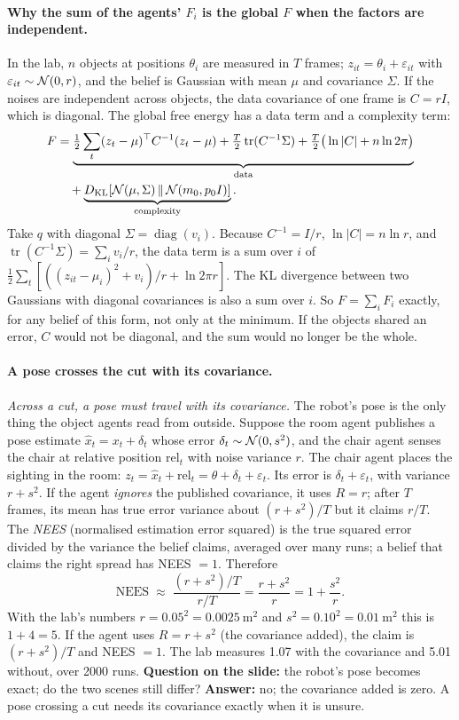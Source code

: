 \documentclass[11pt]{article}
\newcommand{\slt}[1]{\emph{#1}}   %
\begin{document}
\paragraph{Why the sum of the agents' $F_i$ is the global $F$ when the factors are independent.} In the lab, $n$ objects at positions $\theta_i$ are measured in $T$ frames; $z_{it}=\theta_i+\varepsilon_{it}$ with $\varepsilon_{it}\sim\mathcal{N}(0,r)$, and the belief is Gaussian with mean $\mu$ and covariance $\Sigma$. If the noises are independent across objects, the data covariance of one frame is $C=rI$, which is diagonal. The global free energy has a data term and a complexity term:
\begin{align*}
F&=\underbrace{\tfrac12\sum_{t}(z_t-\mu)^{\top}C^{-1}(z_t-\mu)+\tfrac T2\operatorname{tr}(C^{-1}\Sigma)+\tfrac T2\big(\ln|C|+n\ln 2\pi\big)}_{\text{data}}\\
&\quad+\underbrace{D_{\mathrm{KL}}\!\left[\mathcal{N}(\mu,\Sigma)\,\middle\|\,\mathcal{N}(m_0,p_0 I)\right]}_{\text{complexity}} .
\end{align*}
Take $q$ with diagonal $\Sigma=\operatorname{diag}(v_i)$. Because $C^{-1}=I/r$, $\ln|C|=n\ln r$, and $\operatorname{tr}(C^{-1}\Sigma)=\sum_i v_i/r$, the data term is a sum over $i$ of $\tfrac12\sum_t[((z_{it}-\mu_i)^2+v_i)/r+\ln 2\pi r]$. The KL divergence between two Gaussians with diagonal covariances is also a sum over $i$. So $F=\sum_i F_i$ exactly, for any belief of this form, not only at the minimum. If the objects shared an error, $C$ would not be diagonal, and the sum would no longer be the whole.

\paragraph{A pose crosses the cut with its covariance.} \slt{Across a cut, a pose must travel with its covariance.} The robot's pose is the only thing the object agents read from outside. Suppose the room agent publishes a pose estimate $\hat x_t = x_t + \delta_t$ whose error $\delta_t\sim\mathcal{N}(0,s^2)$, and the chair agent senses the chair at relative position $\mathrm{rel}_{t}$ with noise variance $r$. The chair agent places the sighting in the room: $z_t=\hat x_t+\mathrm{rel}_t=\theta+\delta_t+\varepsilon_t$. Its error is $\delta_t+\varepsilon_t$, with variance $r+s^2$. If the agent \emph{ignores} the published covariance, it uses $R=r$; after $T$ frames, its mean has true error variance about $(r+s^2)/T$ but it claims $r/T$. The \emph{NEES} (normalised estimation error squared) is the true squared error divided by the variance the belief claims, averaged over many runs; a belief that claims the right spread has NEES $=1$. Therefore
\[
\text{NEES}\;\approx\;\frac{(r+s^2)/T}{r/T}=\frac{r+s^2}{r}=1+\frac{s^2}{r}.
\]
With the lab's numbers $r=0.05^2=0.0025\ \text{m}^2$ and $s^2=0.10^2=0.01\ \text{m}^2$ this is $1+4=5$. If the agent uses $R=r+s^2$ (the covariance added), the claim is $(r+s^2)/T$ and NEES $=1$. The lab measures 1.07 with the covariance and 5.01 without, over 2000 runs. \textbf{Question on the slide:} the robot's pose becomes exact; do the two scenes still differ? \textbf{Answer:} no; the covariance added is zero. A pose crossing a cut needs its covariance exactly when it is unsure.
\end{document}
